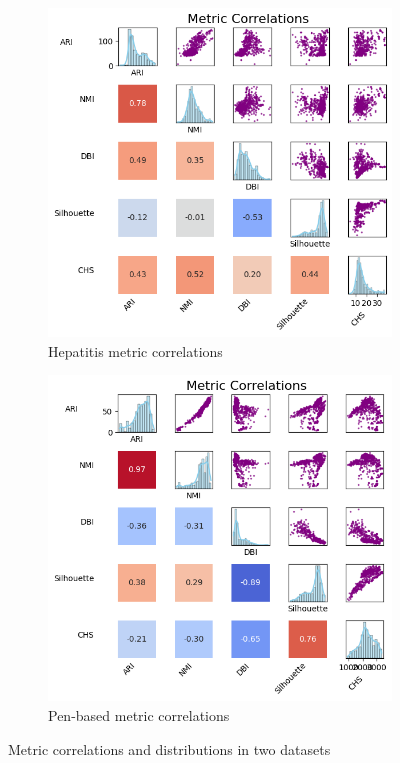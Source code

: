 \begin{figure}[h!]
    \centering
    \begin{subfigure}{0.49\textwidth}
        \centering
        \includegraphics[width=\linewidth]{figures/KMeans/hepatitis_metrics_correlations_matrix.png}
        \caption{Hepatitis metric correlations}
    \end{subfigure}
    \hfill
    \begin{subfigure}{0.49\textwidth}
        \centering
        \includegraphics[width=\linewidth]{figures/KMeans/penbased_metrics_correlations_matrix.png}
        \caption{Pen-based metric correlations}
    \end{subfigure}
    \caption{Metric correlations and distributions in two datasets}
    \label{fig:metrics_corr}
\end{figure}

